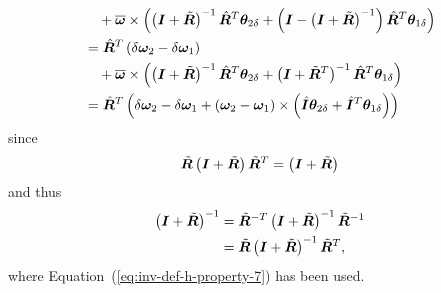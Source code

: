 \documentclass[10pt,fleqn,subeqn]{report}
\newcommand{\T}[1]{\bm{#1}}
\begin{document}
\begin{align}
	& \mbox{\hspace{10pt}} + \overline{\T{\omega}} \times \plbr{
		\plbr{\T{I} + \tilde{\T{R}}}^{-1} \hat{\T{R}}^T \T{\theta}_{2\delta}
		+ \plbr{\T{I} - \plbr{\T{I} + \tilde{\T{R}}}^{-1}} \hat{\T{R}}^T \T{\theta}_{1\delta}
	} \nonumber \\
	&= \hat{\T{R}}^T \plbr{
		\delta\T{\omega}_2 - \delta\T{\omega}_1
	} \nonumber \\
	& \mbox{\hspace{10pt}} + \overline{\T{\omega}} \times \plbr{
		\plbr{\T{I} + \tilde{\T{R}}}^{-1} \hat{\T{R}}^T \T{\theta}_{2\delta}
		+ \plbr{\T{I} + \tilde{\T{R}}^T}^{-1} \hat{\T{R}}^T \T{\theta}_{1\delta}
	} \nonumber \\
	&= \hat{\T{R}}^T \plbr{
		\delta\T{\omega}_2 - \delta\T{\omega}_1
	+ \plbr{\T{\omega}_2 - \T{\omega}_1} \times \plbr{
		\hat{\T{I}} \T{\theta}_{2\delta}
		+ \hat{\T{I}}^T \T{\theta}_{1\delta}
	}}
	\label{eq:inv-deformable-hinge-omega-rel-delta}
\end{align}
since
\begin{equation}
	\tilde{\T{R}}\plbr{\T{I} + \tilde{\T{R}}} \tilde{\T{R}}^T = \plbr{\T{I} + \tilde{\T{R}}}
\end{equation}
and thus
\begin{align}
	\plbr{\T{I} + \tilde{\T{R}}}^{-1}
	&= \tilde{\T{R}}^{-T} \plbr{\T{I} + \tilde{\T{R}}}^{-1} \tilde{\T{R}}^{-1} \nonumber \\
	&= \tilde{\T{R}} \plbr{\T{I} + \tilde{\T{R}}}^{-1} \tilde{\T{R}}^T ,
\end{align}
where Equation~(\ref{eq:inv-def-h-property-7}) has been used.
\end{document}
